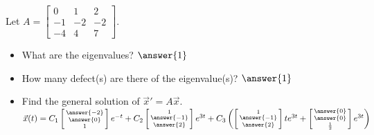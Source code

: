 \documentclass{ximera}
\begin{document}

\begin{exercise}
    Let $A = 
    \left[ 
        \begin{smallmatrix}
            0 & 1 & 2 \\
            -1 & -2 & -2 \\
            -4 & 4 & 7
        \end{smallmatrix} 
    \right]$.
    \begin{itemize}
        \item What are the eigenvalues? $\answer{1}$
        \item How many defect(s) are there of the eigenvalue(s)? $\answer{1}$
        \item Find the general solution of ${\vec{x}}' = A \vec{x}$.\\
            $\vec{x}(t) = C_1\left[\begin{smallmatrix} \answer{-2} \\ \answer{0} \\ 1 \end{smallmatrix}\right]e^{-t} + C_2\left[\begin{smallmatrix} 1 \\ \answer{-1} \\ \answer{2} \end{smallmatrix}\right]e^{3t} + C_3\left(\left[\begin{smallmatrix} 1 \\ \answer{-1} \\ \answer{2} \end{smallmatrix}\right]te^{3t} + \left[\begin{smallmatrix} \answer{0} \\ \answer{0} \\ \frac{1}{2} \end{smallmatrix}\right]e^{3t}\right)$
    \end{itemize}
\end{exercise}
\end{document}
